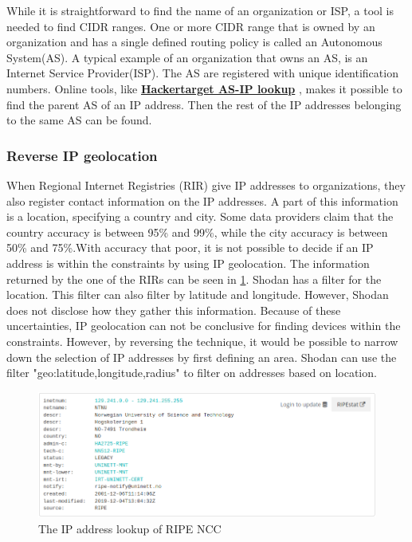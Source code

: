 While it is straightforward to find the name of an organization or ISP, a tool is needed to find CIDR ranges. One or more CIDR range that is owned by an organization and has a single defined routing policy is called an Autonomous System(AS). A typical example of an organization that owns an AS, is an Internet Service Provider(ISP). \cite{AS_def} 
The AS are registered with unique identification numbers. Online tools, like \href{https://hackertarget.com/as-ip-lookup/}{\textbf{Hackertarget AS-IP lookup}} \cite{asip_lookup}, makes it possible to find the parent AS of an IP address. Then the rest of the IP addresses belonging to the same AS can be found.


\subsubsection{Reverse IP geolocation} \label{sec:geo_method}
When Regional Internet Registries (RIR) give IP addresses to organizations, they also register contact information on the IP addresses. A part of this information is a location, specifying a country and city. Some data providers claim that the country accuracy is between 95\% and 99\%, while the city accuracy is between 50\% and 75\%.\cite{geolocation_acc}With accuracy that poor, it is not possible to decide if an IP address is within the constraints by using IP geolocation. The information returned by the one of the RIRs can be seen in \cref{fig:RIPE_NCC}.
Shodan has a filter for the location. This filter can also filter by latitude and longitude. However, Shodan does not disclose how they gather this information. 
Because of these uncertainties, IP geolocation can not be conclusive for finding devices within the constraints. However, by reversing the technique, it would be possible to narrow down the selection of IP addresses by first defining an area. Shodan can use the filter "geo:latitude,longitude,radius" to filter on addresses based on location.  

\begin{figure} [H]
    \centering
    \includegraphics[scale=0.5]{Figurer/ripe.png}
    \caption{The IP address lookup of RIPE NCC \cite{ripe_whois}}
    \label{fig:RIPE_NCC}
\end{figure}

